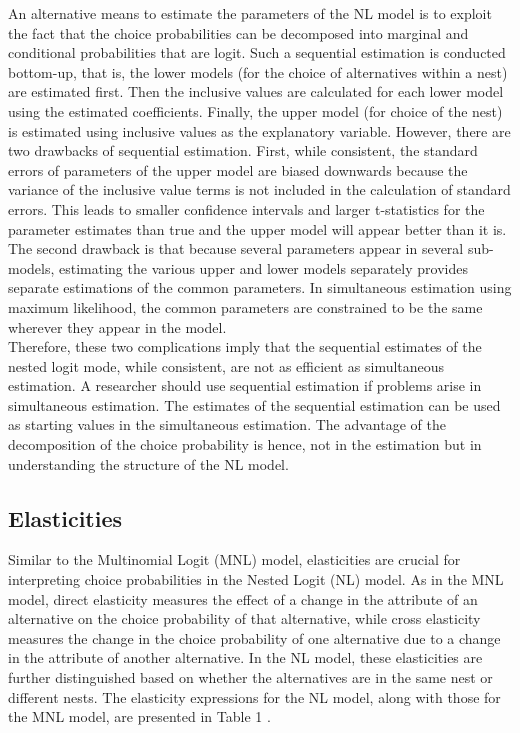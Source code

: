 \documentclass[a4paper,11pt]{article}
\begin{document}
    An alternative means to estimate the parameters of the NL model is to exploit the fact that the choice probabilities can be decomposed into marginal and conditional probabilities that are logit. Such a sequential estimation is conducted bottom-up, that is, the lower models (for the choice of alternatives within a nest) are estimated first. Then the inclusive values are calculated for each lower model using the estimated coefficients. Finally, the upper model (for choice of the nest) is estimated using inclusive values as the explanatory variable. However, there are two drawbacks of sequential estimation. First, while consistent, the standard errors of parameters of the upper model are biased downwards because the variance of the inclusive value terms is not included in the calculation of standard errors. This leads to smaller confidence intervals and larger t-statistics for the parameter estimates than true and the upper model will appear better than it is. The second drawback is that because several parameters appear in several sub-models, estimating the various upper and lower models separately provides separate estimations of the common parameters. In simultaneous estimation using maximum likelihood, the common parameters are constrained to be the same wherever they appear in the model. \\

    Therefore, these two complications imply that the sequential estimates of the nested logit mode, while consistent, are not as efficient as simultaneous estimation. A researcher should use sequential estimation if problems arise in simultaneous estimation. The estimates of the sequential estimation can be used as starting values in the simultaneous estimation. The advantage of the decomposition of the choice probability is hence, not in the estimation but in understanding the structure of the NL model.

\subsection{Elasticities}
\label{subsection:Elasticities}

    Similar to the Multinomial Logit (MNL) model, elasticities are crucial for interpreting choice probabilities in the Nested Logit (NL) model. As in the MNL model, direct elasticity measures the effect of a change in the attribute of an alternative on the choice probability of that alternative, while cross elasticity measures the change in the choice probability of one alternative due to a change in the attribute of another alternative. In the NL model, these elasticities are further distinguished based on whether the alternatives are in the same nest or different nests. The elasticity expressions for the NL model, along with those for the MNL model, are presented in Table 1 \cite{KoppelmanandWen}.\\
\end{document}
